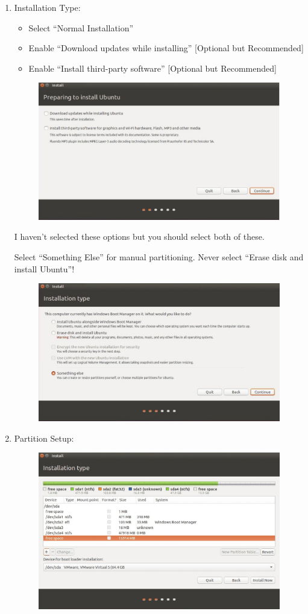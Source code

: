 \documentclass[11pt,a4paper]{article}
\newenvironment{warning}
{\begin{tcolorbox}[colback=warningcolor!10,colframe=warningcolor,title=\textbf{Warning}]}
{\end{tcolorbox}}
\begin{document}
\begin{enumerate}
    \item Installation Type:
    \begin{itemize}
        \item Select ``Normal Installation''
        \item Enable ``Download updates while installing'' [Optional but Recommended]
        \item Enable ``Install third-party software'' [Optional but Recommended]
    \end{itemize}
    \begin{figure}[htp]
        \centering
        \includegraphics[width=0.6\linewidth]{images/step6.png}
        \label{fig:enter-label}
    \end{figure}
    I haven't selected these options but you should select both of these. 
    \begin{warning}
    Select ``Something Else'' for manual partitioning. Never select ``Erase disk and install Ubuntu''!
    \end{warning}
    \begin{figure}[htp]
        \centering
        \includegraphics[width=0.6\linewidth]{images/step7.png}
        \label{fig:enter-label}
    \end{figure}
    \item Partition Setup:
    \begin{figure}[htp]
        \centering
        \includegraphics[width=0.6\linewidth]{images/step8.png}

\end{figure}
\end{enumerate}
\end{document}
